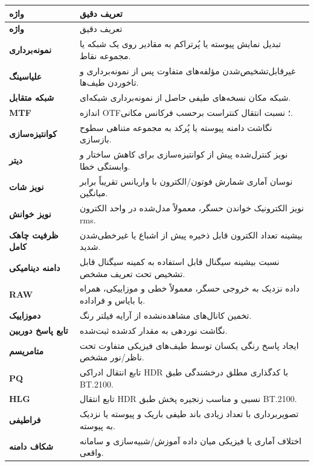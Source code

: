\documentclass[12pt,openany,oneside]{book}
\begin{document}
\begin{longtable}{>{\bfseries}p{}p{}}
\toprule
واژه & تعریف دقیق\\
\midrule
\endfirsthead
\toprule
واژه & تعریف دقیق\\
\midrule
\endhead
نمونه‌برداری & تبدیل نمایش پیوسته یا پُرتراکم به مقادیر روی یک شبکه یا مجموعه نقاط.\\
علیاسینگ & غیرقابل‌تشخیص‌شدن مؤلفه‌های متفاوت پس از نمونه‌برداری و تاخوردن طیف‌ها.\\
شبکه متقابل & شبکه مکان نسخه‌های طیفی حاصل از نمونه‌برداری شبکه‌ای.\\
MTF & اندازه OTF؛ نسبت انتقال کنتراست برحسب فرکانس مکانی.\\
کوانتیزه‌سازی & نگاشت دامنه پیوسته یا پُرکد به مجموعه متناهی سطوح بازسازی.\\
دیتر & نویز کنترل‌شده پیش از کوانتیزه‌سازی برای کاهش ساختار و وابستگی خطا.\\
نویز شات & نوسان آماری شمارش فوتون/الکترون با واریانس تقریباً برابر میانگین.\\
نویز خوانش & نویز الکترونیک خواندن حسگر، معمولاً مدل‌شده در واحد الکترون rms.\\
ظرفیت چاهک کامل & بیشینه تعداد الکترون قابل ذخیره پیش از اشباع یا غیرخطی‌شدن شدید.\\
دامنه دینامیکی & نسبت بیشینه سیگنال قابل استفاده به کمینه سیگنال قابل تشخیص تحت تعریف مشخص.\\
RAW & داده نزدیک به خروجی حسگر، معمولاً خطی و موزاییکی، همراه با بایاس و فراداده.\\
دموزاییک & تخمین کانال‌های مشاهده‌نشده از آرایه فیلتر رنگ.\\
تابع پاسخ دوربین & نگاشت نوردهی به مقدار کدشده ثبت‌شده.\\
متامریسم & ایجاد پاسخ رنگی یکسان توسط طیف‌های فیزیکی متفاوت تحت ناظر/نور مشخص.\\
PQ & تابع انتقال ادراکی HDR با کدگذاری مطلق درخشندگی طبق BT.2100.\\
HLG & تابع انتقال HDR نسبی و مناسب زنجیره پخش طبق BT.2100.\\
فراطیفی & تصویربرداری با تعداد زیادی باند طیفی باریک و پیوسته یا نزدیک به پیوسته.\\
شکاف دامنه & اختلاف آماری یا فیزیکی میان داده آموزش/شبیه‌سازی و سامانه واقعی.\\
\bottomrule
\end{longtable}
\end{document}
